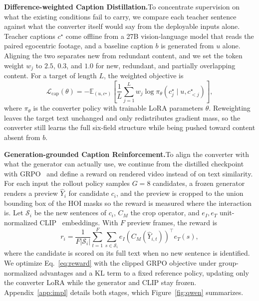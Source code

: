 \documentclass{article}
\begin{document}
\textbf{Difference-weighted Caption Distillation.}\quad To concentrate supervision on what
the existing conditions fail to carry, we compare each teacher sentence against
what the converter itself would say from the deployable inputs alone. Teacher
captions $c^\star$ come offline from a 27B vision-language model that reads the
paired egocentric footage, and a baseline caption $b$ is generated from $u$ alone.
Aligning the two separates new from redundant content, and we set the token weight
$w_j$ to $2.5$, $0.3$, and $1.0$ for new, redundant, and partially overlapping
content. For a target of length $L$, the
weighted objective is
\begin{equation}
\mathcal{L}_{\mathrm{cap}}(\theta) = -\mathbb{E}_{(u,c^\star)}\left[
\frac{1}{L}\sum_{j=1}^{L} w_j \log \pi_\theta\!\left(c^\star_j \mid u,
c^\star_{<j}\right)\right],
\label{eq:sft}
\end{equation}
where $\pi_\theta$ is the converter policy with trainable LoRA parameters
$\theta$. Reweighting leaves the target text unchanged and only redistributes gradient
mass, so the converter still learns the full six-field structure while being
pushed toward content absent from $b$.

\textbf{Generation-grounded Caption Reinforcement.}\quad To align the
converter with what the generator can actually use, we continue from the
distilled checkpoint with GRPO~\citep{shao2024grpo} and define a reward on
rendered video instead of on text similarity. For each input the rollout policy samples $G=8$
candidates, a frozen generator renders a preview $\widehat{Y}_i$ for candidate
$c_i$, and the preview is cropped to the union bounding box of the HOI masks so
the reward is measured where the interaction is. Let $\mathcal{S}_i$ be the new
sentences of $c_i$, $C_M$ the crop operator, and $e_I, e_T$ unit-normalized
CLIP~\citep{radford2021clip} embeddings. With $F$ preview frames, the reward is
\begin{equation}
r_i = \frac{1}{F|\mathcal{S}_i|}\sum_{t=1}^{F}\sum_{s\in\mathcal{S}_i}
e_I\!\left(C_M(\widehat{Y}_{i,t})\right)^{\!\top} e_T(s),
\label{eq:reward}
\end{equation}
where the candidate is scored on its full text when no new sentence is
identified. We optimize Eq.~\ref{eq:reward} with the clipped GRPO objective under
group-normalized advantages and a KL term to a fixed reference policy, updating
only the converter LoRA while the generator and CLIP stay frozen.
Appendix~\ref{app:impl} details both stages, which
Figure~\ref{fig:qwen} summarizes.
\end{document}
